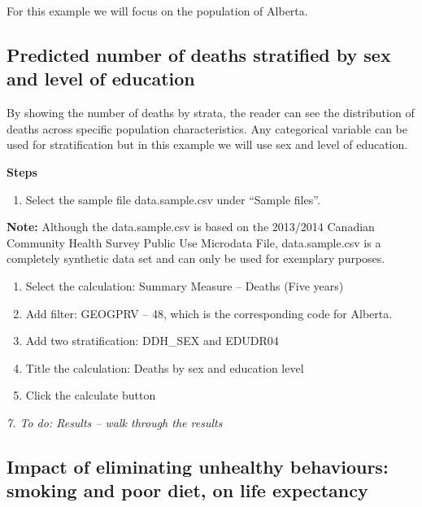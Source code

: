\documentclass[]{book}
\providecommand{\tightlist}{%
  \setlength{\itemsep}{0pt}\setlength{\parskip}{0pt}}
\begin{document}
For this example we will focus on the population of Alberta.

\hypertarget{predicted-number-of-deaths-stratified-by-sex-and-level-of-education}{%
\subsection{Predicted number of deaths stratified by sex and level of education}\label{predicted-number-of-deaths-stratified-by-sex-and-level-of-education}}

By showing the number of deaths by strata, the reader can see the distribution of deaths across specific population characteristics. Any categorical variable can be used for stratification but in this example we will use sex and level of education.

\textbf{Steps}

\begin{enumerate}
\def\labelenumi{\arabic{enumi}.}
\tightlist
\item
  Select the sample file data.sample.csv under ``Sample files''.
\end{enumerate}

\textbf{Note:} Although the data.sample.csv is based on the 2013/2014 Canadian Community Health Survey Public Use Microdata File, data.sample.csv is a completely synthetic data set and can only be used for exemplary purposes.

\begin{enumerate}
\def\labelenumi{\arabic{enumi}.}
\setcounter{enumi}{1}
\item
  Select the calculation: Summary Measure -- Deaths (Five years)
\item
  Add filter: GEOGPRV -- 48, which is the corresponding code for Alberta.
\item
  Add two stratification: DDH\_SEX and EDUDR04
\item
  Title the calculation: Deaths by sex and education level
\item
  Click the calculate button
\end{enumerate}

\emph{7. To do: Results -- walk through the results}

\hypertarget{impact-of-eliminating-unhealthy-behaviours-smoking-and-poor-diet-on-life-expectancy}{%
\subsection{Impact of eliminating unhealthy behaviours: smoking and poor diet, on life expectancy}\label{impact-of-eliminating-unhealthy-behaviours-smoking-and-poor-diet-on-life-expectancy}}
\end{document}
